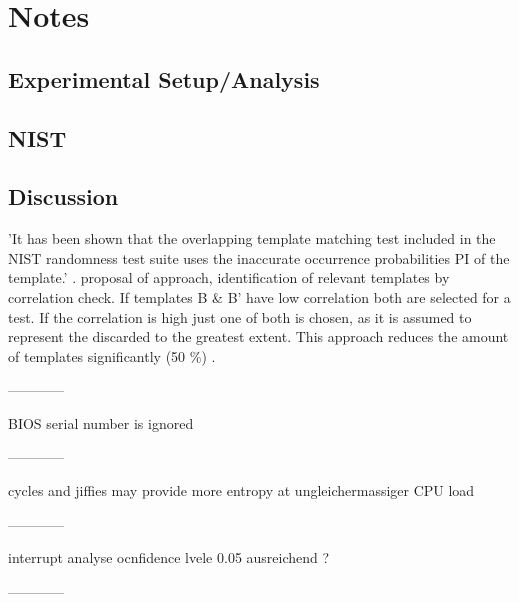 \chapter{Notes}
\label{cha:notes}

\section{Experimental Setup/Analysis}


\section{NIST}




\section{Discussion}

'It has been shown that the overlapping template matching test included in the NIST randomness test suite uses the inaccurate occurrence probabilities PI of the template.'
\cite{hamano2007correction,chen2016templates}. \cite{chen2016templates} proposal of approach, identification of relevant templates by correlation check. If templates B \&  B' have low correlation
both are selected for a test. If the correlation is high just one of both is chosen, as it is assumed to represent the discarded to the greatest extent. This approach reduces the amount of templates significantly (50 \%) \cite{chen2016templates}.

------------

BIOS serial number is ignored

------------

cycles and jiffies may provide more entropy at ungleichermassiger CPU load

------------

interrupt analyse ocnfidence lvele 0.05 ausreichend ?

------------
